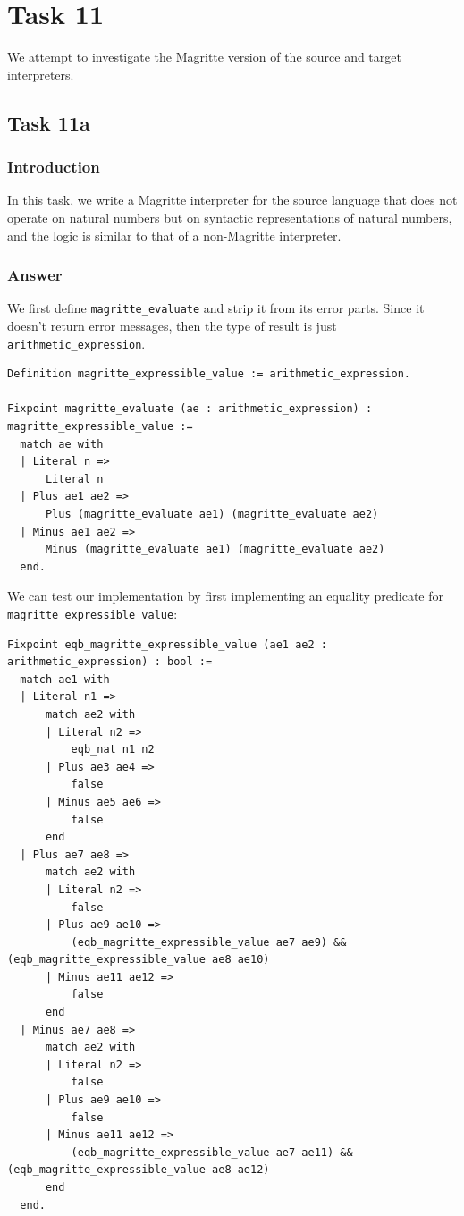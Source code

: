 \documentclass{article}
\begin{document}
\section{Task 11}
We attempt to investigate the Magritte version of the source and target interpreters.

\subsection{Task 11a}
\subsubsection{Introduction}
In this task, we write a Magritte interpreter for the source language that does not operate on natural numbers but on syntactic representations of natural numbers, and the logic is similar to that of a non-Magritte interpreter.

\subsubsection{Answer}
We first define \texttt{magritte\_evaluate} and strip it from its error parts. Since it doesn't return error messages, then the type of result is just \texttt{arithmetic\_expression}.
\begin{lstlisting}
Definition magritte_expressible_value := arithmetic_expression.

Fixpoint magritte_evaluate (ae : arithmetic_expression) : magritte_expressible_value :=
  match ae with
  | Literal n =>
      Literal n
  | Plus ae1 ae2 =>
      Plus (magritte_evaluate ae1) (magritte_evaluate ae2)
  | Minus ae1 ae2 =>
      Minus (magritte_evaluate ae1) (magritte_evaluate ae2)
  end.
\end{lstlisting}

We can test our implementation by first implementing an equality predicate for \texttt{magritte\_expressible\_value}:

\begin{lstlisting}
Fixpoint eqb_magritte_expressible_value (ae1 ae2 : arithmetic_expression) : bool :=
  match ae1 with
  | Literal n1 =>
      match ae2 with
      | Literal n2 =>
          eqb_nat n1 n2
      | Plus ae3 ae4 =>
          false
      | Minus ae5 ae6 =>
          false
      end
  | Plus ae7 ae8 =>
      match ae2 with
      | Literal n2 =>
          false
      | Plus ae9 ae10 =>
          (eqb_magritte_expressible_value ae7 ae9) && (eqb_magritte_expressible_value ae8 ae10)
      | Minus ae11 ae12 =>
          false
      end
  | Minus ae7 ae8 =>
      match ae2 with
      | Literal n2 =>
          false
      | Plus ae9 ae10 =>
          false
      | Minus ae11 ae12 =>
          (eqb_magritte_expressible_value ae7 ae11) && (eqb_magritte_expressible_value ae8 ae12)
      end
  end.
\end{lstlisting}
\end{document}
